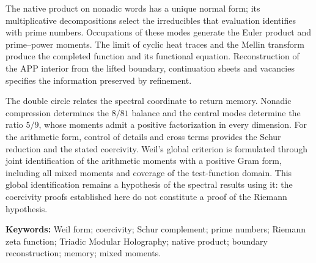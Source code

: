 The native product on nonadic words has a unique normal form;
its multiplicative decompositions select the irreducibles that
evaluation identifies with prime numbers. Occupations of these
modes generate the Euler product and prime--power moments.
The limit of cyclic heat traces and the Mellin transform produce
the completed function and its functional equation. Reconstruction
of the APP interior from the lifted boundary, continuation sheets
and vacancies specifies the information preserved by refinement.

The double circle relates the spectral coordinate to return
memory. Nonadic compression determines the $8/81$ balance and
the central modes determine the ratio $5/9$, whose moments admit
a positive factorization in every dimension. For the arithmetic
form, control of details and cross terms provides the Schur
reduction and the stated coercivity. Weil's global criterion is
formulated through joint identification of the arithmetic moments
with a positive Gram form, including all mixed moments and
coverage of the test-function domain. This global identification
remains a hypothesis of the spectral results using it: the
coercivity proofs established here do not constitute a proof
of the Riemann hypothesis.

\medskip
\noindent\textbf{Keywords:} Weil form; coercivity;
Schur complement; prime numbers; Riemann zeta function;
Triadic Modular Holography; native product; boundary
reconstruction; memory; mixed moments.
\par\endgroup
